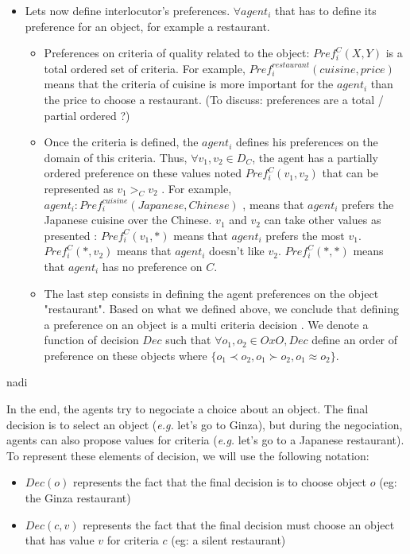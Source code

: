 \documentclass{llncs}
\begin{document}
\begin{itemize}
 \item Lets now define interlocutor's preferences. $\forall agent_{i}$ that has to define its preference for an object, for example a restaurant.
 \begin{itemize}
 \item Preferences on criteria of quality related to the object: $Pref_{i}^C (X,Y) $ is a total ordered set of criteria. For example, $ Pref_{i}^{restaurant} (cuisine,price)$ means that the criteria of cuisine is more important for the $agent_{i}$  than the price to choose a restaurant. (To discuss: preferences are a total / partial ordered ?)
 \item Once the criteria is defined, the $agent_{i}$ defines his preferences on the domain of this criteria. Thus, $\forall v_{1} , v_{2} \in D_{C}$, the agent has a  partially ordered preference on these values noted $Pref_{i}^C (v_{1}, v_{2})$  that can be represented as $v_{1}>_{C} v_{2}$ . For example, $agent_{i}:  Pref_{i}^{cuisine} (Japanese , Chinese)$ , means that  $agent_{i}$ prefers the Japanese cuisine over the Chinese. $v_{1} $ and $ v_{2}$ can take other values as presented : 
 \subitem $Pref_{i}^C (v_{1}, *)$ means that $agent_{i}$ prefers the most $v_{1}$. 
 \subitem $Pref_{i}^C (*,v_{2})$ means that $agent_{i}$ doesn't like  $v_{2}$. 
 \subitem $Pref_{i}^C (*,*)$ means that $agent_{i}$ has no preference on $C$. 
 \item The last step consists in defining the agent preferences on the object "restaurant". Based on what we defined above, we conclude that defining a preference on an object is a multi criteria decision \cite{figueira2005multiple}. We denote a function of decision  $Dec$ such that $\forall o_{1}, o_{2} \in O x O, Dec$ define an order of preference on these objects where  $\{o_{1}\prec o_{2}, o_{1} \succ o_{2}, o_{1} \approx o_{2}\}$.
 \end{itemize} 
 \end{itemize}nadi
 
 In the end, the agents try to negociate a choice about an object. The final decision is to select an object (\emph{e.g.} let's go to Ginza), but during the negociation, agents can also propose values for criteria (\emph{e.g.} let's go to a Japanese restaurant). To represent these elements of decision, we will use the following notation:
 \begin{itemize}
   \item $Dec(o)$ represents the fact that the final decision is to choose object $o$ (eg: the Ginza restaurant)
   \item $Dec(c,v)$ represents the fact that the final decision must choose an object that has value $v$ for criteria $c$ (eg: a silent restaurant)
 \end{itemize}
\end{document}

